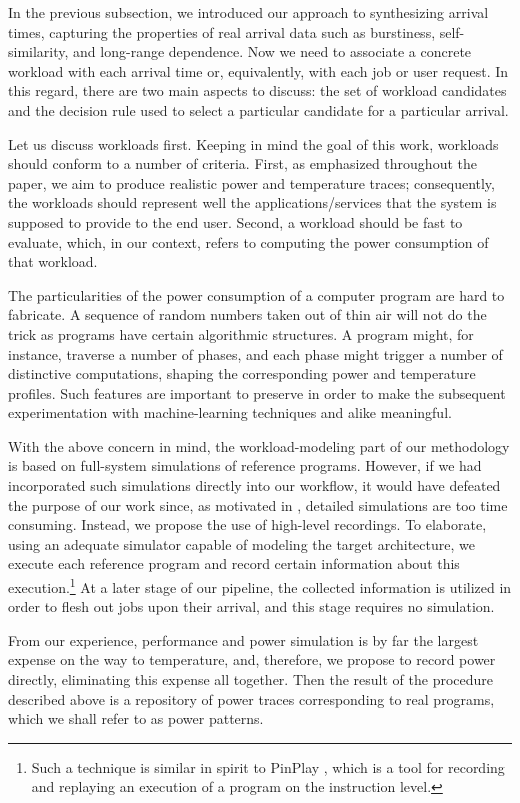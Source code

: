 In the previous subsection, we introduced our approach to synthesizing arrival
times, capturing the properties of real arrival data such as burstiness,
self-similarity, and long-range dependence. Now we need to associate a concrete
workload with each arrival time or, equivalently, with each job or user request.
In this regard, there are two main aspects to discuss: the set of workload
candidates and the decision rule used to select a particular candidate for a
particular arrival.

Let us discuss workloads first. Keeping in mind the goal of this work, workloads
should conform to a number of criteria. First, as emphasized throughout the
paper, we aim to produce realistic power and temperature traces; consequently,
the workloads should represent well the applications/services that the system is
supposed to provide to the end user. Second, a workload should be fast to
evaluate, which, in our context, refers to computing the power consumption of
that workload.

The particularities of the power consumption of a computer program are hard to
fabricate. A sequence of random numbers taken out of thin air will not do the
trick as programs have certain algorithmic structures. A program might, for
instance, traverse a number of phases, and each phase might trigger a number of
distinctive computations, shaping the corresponding power and temperature
profiles. Such features are important to preserve in order to make the
subsequent experimentation with machine-learning techniques and alike
meaningful.

With the above concern in mind, the workload-modeling part of our methodology is
based on full-system simulations of reference programs. However, if we had
incorporated such simulations directly into our workflow, it would have defeated
the purpose of our work since, as motivated in , detailed
simulations are too time consuming. Instead, we propose the use of high-level
recordings. To elaborate, using an adequate simulator capable of modeling the
target architecture, we execute each reference program and record certain
information about this execution.\footnote{Such a technique is similar in spirit
to PinPlay \cite{patil2010}, which is a tool for recording and replaying an
execution of a program on the instruction level.} At a later stage of our
pipeline, the collected information is utilized in order to flesh out jobs upon
their arrival, and this stage requires no simulation.

From our experience, performance and power simulation is by far the largest
expense on the way to temperature, and, therefore, we propose to record power
directly, eliminating this expense all together. Then the result of the
procedure described above is a repository of power traces corresponding to real
programs, which we shall refer to as power patterns.

